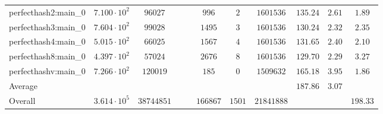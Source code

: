 \begin{tabular}{|l|c|c|c|c|c|c|c|c|c|c|}
perfecthash2:main\_0           & $ 7.100 \cdot 10^{2} $ & $ 96027    $ & $  $ & $    $ & $ 996    $ & $ 2    $ & $ 1601536  $ & $ 135.24      $ & $ 2.61    $ & $ 1.89    $ \\
perfecthash3:main\_0           & $ 7.604 \cdot 10^{2} $ & $ 99028    $ & $  $ & $    $ & $ 1495   $ & $ 3    $ & $ 1601536  $ & $ 130.24      $ & $ 2.32    $ & $ 2.35    $ \\
perfecthash4:main\_0           & $ 5.015 \cdot 10^{2} $ & $ 66025    $ & $  $ & $    $ & $ 1567   $ & $ 4    $ & $ 1601536  $ & $ 131.65      $ & $ 2.40    $ & $ 2.10    $ \\
perfecthash8:main\_0           & $ 4.397 \cdot 10^{2} $ & $ 57024    $ & $  $ & $    $ & $ 2676   $ & $ 8    $ & $ 1601536  $ & $ 129.70      $ & $ 2.29    $ & $ 3.27    $ \\
perfecthashv:main\_0           & $ 7.266 \cdot 10^{2} $ & $ 120019   $ & $  $ & $    $ & $ 185    $ & $ 0    $ & $ 1509632  $ & $ 165.18      $ & $ 3.95    $ & $ 1.86    $ \\
\hline
Average                        & $                    $ & $          $ & $  $ & $    $ & $        $ & $      $ & $          $ & $ 187.86      $ & $ 3.07    $ & $         $ \\
\hline
Overall                        & $ 3.614 \cdot 10^{5} $ & $ 38744851 $ & $  $ & $    $ & $ 166867 $ & $ 1501 $ & $ 21841888 $ & $             $ & $         $ & $ 198.33  $ \\
\hline
\end{tabular}
